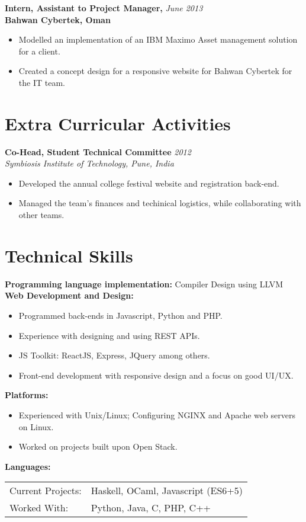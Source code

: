 \documentclass[a4paper,overlapped]{res}
\begin{document}
\begin{resume}
  \textbf{Intern, Assistant to Project Manager,}  \hfill \textit{June 2013}\\
  \textbf{Bahwan Cybertek, Oman}
  \begin{itemize}
  \item Modelled an implementation of an IBM Maximo Asset management 
    solution for a client. 
  \item Created a concept design for a responsive website for Bahwan Cybertek 
    for the IT team. 
  \end{itemize}

  \section{Extra Curricular Activities}  

  \textbf{Co-Head, Student Technical Committee}   \hfill \textit{2012} \\
  \textit{Symbiosis Institute of Technology, Pune, India}
  \begin{itemize}
  \item Developed the annual college festival website and registration back-end.
  \item Managed the team's finances and techinical logistics, while collaborating 
    with other teams.
  \end{itemize}

  \section{Technical Skills} 
  \textbf{Programming language implementation:} Compiler Design using LLVM \\
  \textbf{Web Development and Design:}
  \begin{itemize}
  \item Programmed back-ends in Javascript, Python and PHP.
  \item Experience with designing and using REST APIs.
  \item JS Toolkit: ReactJS, Express, JQuery among
    others.
  \item Front-end development with responsive design and a focus on good UI/UX.
  \end{itemize}
  \textbf{Platforms:}
  \begin{itemize}
  \item Experienced with Unix/Linux; Configuring NGINX and Apache web servers on
    Linux.
  \item Worked on projects built upon Open Stack. 
  \end{itemize}
  \textbf{Languages:} \\ 
  \begin{tabular}{l l}
    Current Projects: & Haskell, OCaml, Javascript (ES6+5) \\ 
    Worked With: & Python, Java, C, PHP, C++
  \end{tabular}



\end{resume}
\end{document}
